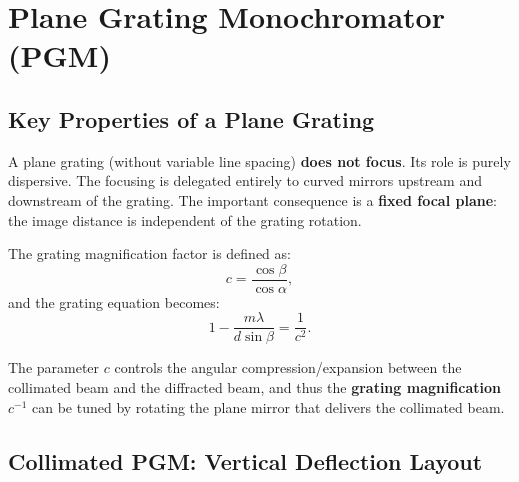 \documentclass[12pt,a4paper]{article}
\newcommand{\al}{\alpha}
\newcommand{\be}{\beta}
\newcommand{\la}{\lambda}
\begin{document}
\section{Plane Grating Monochromator (PGM)}

\subsection{Key Properties of a Plane Grating}

A plane grating (without variable line spacing) \textbf{does not focus}.  Its role is
purely dispersive.  The focusing is delegated entirely to curved mirrors upstream and
downstream of the grating.  The important consequence is a \textbf{fixed focal plane}:
the image distance is independent of the grating rotation.

The grating magnification factor is defined as:
\begin{equation}
  c = \frac{\cos\be}{\cos\al},
  \label{eq:c_factor}
\end{equation}
and the grating equation becomes:
\begin{equation}
  1 - \frac{m\la}{d\sin\be} = \frac{1}{c^2}.
  \label{eq:PGM_grating}
\end{equation}

The parameter $c$ controls the angular compression/expansion between the collimated beam
and the diffracted beam, and thus the \textbf{grating magnification} $c^{-1}$ can be
tuned by rotating the plane mirror that delivers the collimated beam.

\subsection{Collimated PGM: Vertical Deflection Layout}
\end{document}
